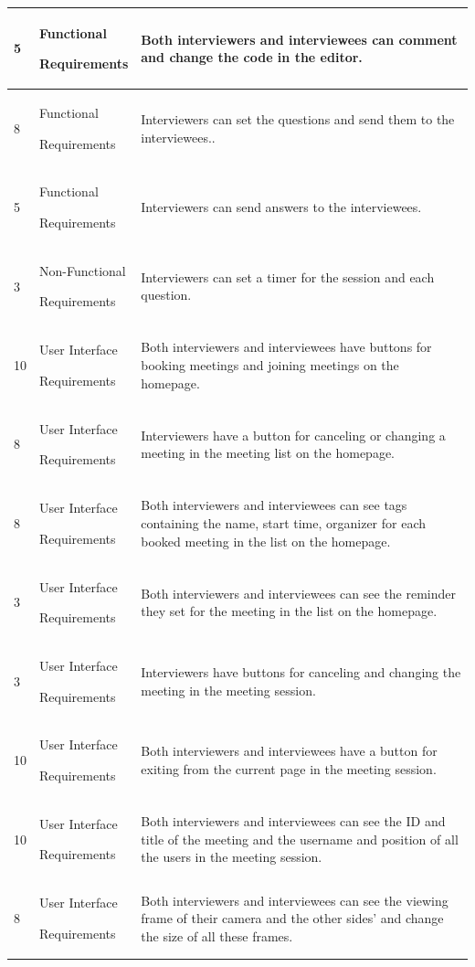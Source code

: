 \documentclass{article}
\begin{document}
\begin{longtable}{ |p{1cm}||p{2.3cm}|p{9cm}|  }
  5 &  Functional\par Requirements  & Both interviewers and interviewees can comment and change the code in the editor.\\
  \hline
  8 &  Functional\par Requirements  & Interviewers can set the questions and send them to the interviewees..\\
  \hline
  5 &  Functional\par Requirements  & Interviewers can send answers to the interviewees.\\
  \hline
  3 &  Non-Functional\par Requirements  & Interviewers can set a timer for the session and each question.\\
  \hline
  10 &  User Interface\par Requirements  & Both interviewers and interviewees have buttons for booking meetings and joining meetings on the homepage.\\
  \hline
  8 &  User Interface\par Requirements  & Interviewers have a button for canceling or changing a meeting in the meeting list on the homepage.\\
  \hline
  8 &  User Interface\par Requirements  & Both interviewers and interviewees can see tags containing the name, start time, organizer for each booked meeting in the list on the homepage.\\
  \hline
  3 &  User Interface\par Requirements  & Both interviewers and interviewees can see the reminder they set for the meeting in the list on the homepage.\\
  \hline
  3 &  User Interface\par Requirements  & Interviewers have buttons for canceling and changing the meeting in the meeting session.\\
  \hline
  10 &  User Interface\par Requirements  & Both interviewers and interviewees have a button for exiting from the current page in the meeting session.\\
  \hline
  10 &  User Interface\par Requirements  & Both interviewers and interviewees can see the ID and title of the meeting and the username and position of all the users in the meeting session.\\
  \hline
  8 &  User Interface\par Requirements  & Both interviewers and interviewees can see the viewing frame of their camera and the other sides' and change the size of all these frames.\\
 
  \hline
  \end{longtable}
\end{document}
